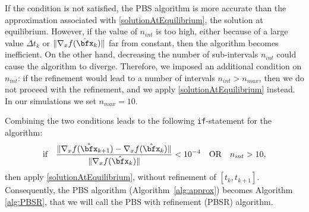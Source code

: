 \documentclass[DIV=12]{scrartcl} %
\theoremstyle{definition}
\begin{document}
If the condition is not satisfied, the PBS algorithm is more accurate than the approximation associated with \eqref{solutionAtEquilibrium}, the solution at equilibrium. However, if the value of $n_{int}$ is too high, either because of a large value $\Delta t_k$ or $\|\nabla_xf(\hat{\bfx}_k)\|$ far from constant, then the algorithm becomes inefficient. On the other hand, decreasing the number of sub-intervals $n_{int}$ could cause the algorithm to diverge. Therefore, we imposed an additional condition on $n_{int}$: if the refinement would lead to a number of intervals $n_{int}>n_{max}$, then we do not proceed with the refinement, and we apply \eqref{solutionAtEquilibrium} instead. In our simulations we set $n_{max} = 10$.

Combining the two conditions leads to the following \texttt{if}-statement for the algorithm:
\begin{equation}
    \label{eq:ifStat}
    \text{if}\quad \frac{\|\nabla_xf(\hat{\bfx}_{k+1})-\nabla_xf(\hat{\bfx}_k)\|}{\|\nabla_xf(\hat{\bfx}_k)\|} < 10^{-4}\quad\text{OR}\quad n_{int}>10,
\end{equation}
then apply \eqref{solutionAtEquilibrium}, without refinement of $[t_k,t_{k+1}]$. Consequently, the PBS algorithm (Algorithm~\ref{alg:approx}) becomes Algorithm \ref{alg:PBSR}, that we will call the PBS with refinement (PBSR) algorithm.
\end{document}
